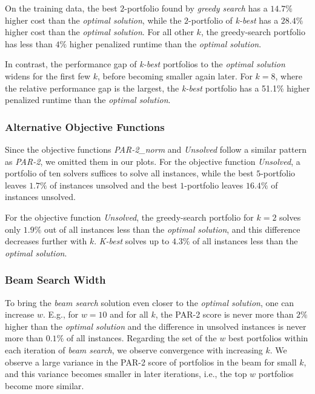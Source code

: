 \documentclass[conference]{IEEEtran}
\begin{document}
On the training data, the best $2$-portfolio found by \emph{greedy search} has a $14.7\%$ higher cost than the \emph{optimal solution}, while the $2$-portfolio of \emph{k-best} has a $28.4\%$ higher cost than the \emph{optimal solution}. 
For all other $k$, the greedy-search portfolio has less than $4\%$ higher penalized runtime than the \emph{optimal solution}.

In contrast, the performance gap of \emph{k-best} portfolios to the \emph{optimal solution} widens for the first few $k$, before becoming smaller again later.
For $k=8$, where the relative performance gap is the largest, the \emph{k-best} portfolio has a 51.1\% higher penalized runtime than the \emph{optimal solution}.

\subsubsection{Alternative Objective Functions}

Since the objective functions \emph{PAR-2\_norm} and \emph{Unsolved} follow a similar pattern as \emph{PAR-2}, we omitted them in our plots. 
For the objective function \emph{Unsolved}, a portfolio of ten solvers suffices to solve all instances, while the best $5$-portfolio leaves $1.7\%$ of instances unsolved and the best $1$-portfolio leaves $16.4\%$ of instances unsolved.

For the objective function \emph{Unsolved}, the greedy-search portfolio for $k=2$ solves only $1.9\%$ out of all instances less than the \emph{optimal solution}, and this difference decreases further with $k$.
\emph{K-best} solves up to $4.3\%$ of all instances less than the \emph{optimal solution}.

\subsubsection{Beam Search Width}

To bring the \emph{beam search} solution even closer to the \emph{optimal solution}, one can increase $w$.
E.g., for $w=10$ and for all $k$, the PAR-2 score is never more than $2\%$ higher than the \emph{optimal solution} and the difference in unsolved instances is never more than $0.1\%$ of all instances.
Regarding the set of the $w$ best portfolios within each iteration of \emph{beam search}, we observe convergence with increasing $k$. 
We observe a large variance in the PAR-2 score of portfolios in the beam for small $k$, and this variance becomes smaller in later iterations, i.e., the top $w$ portfolios become more similar. 
\end{document}
